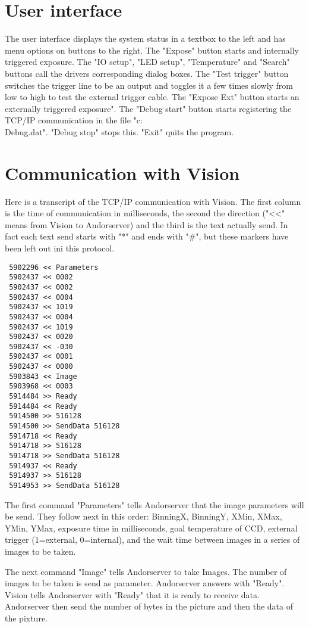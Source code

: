 \documentclass[10pt]{article}
\begin{document}
\section{User interface}

The user interface displays the system status in a textbox to the
left and has menu options on buttons to the right. The "Expose"
button starts and internally triggered exposure. The "IO setup",
"LED setup", "Temperature" and "Search" buttons call the drivers
corresponding dialog boxes. The "Test trigger" button switches the
trigger line to be an output and toggles it a few times slowly
from low to high to test the external trigger cable. The "Expose
Ext" button starts an externally triggered exposure". The "Debug
start" button starts registering the TCP/IP communication in the
file "c:\\Debug.dat". "Debug stop" stops this. "Exit" quits the
program.

\section{Communication with Vision}

Here is a transcript of the TCP/IP communication with Vision. The
first column is the time of communication in milliseconds, the
second the direction ("<<" means from Vision to Andorserver) and
the third is the text actually send. In fact each text send starts
with "*" and ends with "\#", but these markers have been left out
ini this protocol.

\begin{verbatim}
 5902296 << Parameters
 5902437 << 0002
 5902437 << 0002
 5902437 << 0004
 5902437 << 1019
 5902437 << 0004
 5902437 << 1019
 5902437 << 0020
 5902437 << -030
 5902437 << 0001
 5902437 << 0000
 5903843 << Image
 5903968 << 0003
 5914484 >> Ready
 5914484 << Ready
 5914500 >> 516128
 5914500 >> SendData 516128
 5914718 << Ready
 5914718 >> 516128
 5914718 >> SendData 516128
 5914937 << Ready
 5914937 >> 516128
 5914953 >> SendData 516128
\end{verbatim}

The first command "Parameters" tells Andorserver that the image
parameters will be send. They follow next in this order: BinningX,
BinningY, XMin, XMax, YMin, YMax, exposure time in milliseconds,
goal temperature of CCD, external trigger (1=external,
0=internal), and the wait time between images in a series of
images to be taken.

The next command "Image" tells Andorserver to take Images. The
number of images to be taken is send as parameter. Andorserver
answers with "Ready". Vision tells Andorserver with "Ready" that
it is ready to receive data. Andorserver then send the number of
bytes in the picture and then the data of the pixture.
\end{document}
